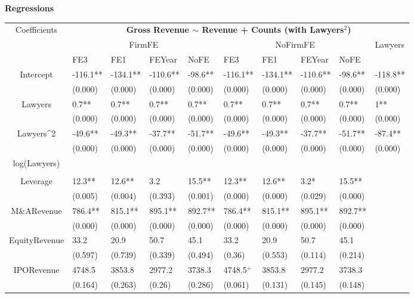 \documentclass{article}
\begin{document}
\newpage
{\large \textbf{Regressions} }
\begin{table}[H]
\centering
\begin{tabular}{|clllllllll|}
\hline
\multirow{3}{*}{Coefficients} & \multicolumn{9}{c|}{\textbf{Gross Revenue $\sim$ Revenue + Counts (with Lawyers$^2$)}} \\
\cline{2-10}
& \multicolumn{4}{c}{FirmFE} & \multicolumn{4}{c}{NoFirmFE} & \multirow{2}{*}{Lawyers} \\
\cline{2-9}
& FE3 & FE1 & FEYear & NoFE & FE3 & FE1 & FEYear & NoFE &  \\
\hline
 
Intercept & -116.1** & -134.1** & -110.6** & -98.6** & -116.1** & -134.1** & -110.6** & -98.6** & -118.8** \\ 
   & (0.000) & (0.000) & (0.000) & (0.000) & (0.000) & (0.000) & (0.000) & (0.000) & (0.000) \\ 
  Lawyers & 0.7** & 0.7** & 0.7** & 0.7** & 0.7** & 0.7** & 0.7** & 0.7** & 1** \\ 
   & (0.000) & (0.000) & (0.000) & (0.000) & (0.000) & (0.000) & (0.000) & (0.000) & (0.000) \\ 
  Lawyers^2 & -49.6** & -49.3** & -37.7** & -51.7** & -49.6** & -49.3** & -37.7** & -51.7** & -87.4** \\ 
   & (0.000) & (0.000) & (0.000) & (0.000) & (0.000) & (0.000) & (0.000) & (0.000) & (0.000) \\ 
  log(Lawyers) &  &  &  &  &  &  &  &  &  \\ 
   &  &  &  &  &  &  &  &  &  \\ 
  Leverage & 12.3** & 12.6** & 3.2 & 15.5** & 12.3** & 12.6** & 3.2* & 15.5** &  \\ 
   & (0.005) & (0.004) & (0.393) & (0.001) & (0.000) & (0.000) & (0.029) & (0.000) &  \\ 
  M\&ARevenue & 786.4** & 815.1** & 895.1** & 892.7** & 786.4** & 815.1** & 895.1** & 892.7** &  \\ 
   & (0.000) & (0.000) & (0.000) & (0.000) & (0.000) & (0.000) & (0.000) & (0.000) &  \\ 
  EquityRevenue & 33.2 & 20.9 & 50.7 & 45.1 & 33.2 & 20.9 & 50.7 & 45.1 &  \\ 
   & (0.597) & (0.739) & (0.339) & (0.494) & (0.36) & (0.553) & (0.114) & (0.214) &  \\ 
  IPORevenue & 4748.5 & 3853.8 & 2977.2 & 3738.3 & 4748.5$^{+}$ & 3853.8 & 2977.2 & 3738.3 &  \\ 
   & (0.164) & (0.263) & (0.26) & (0.286) & (0.061) & (0.131) & (0.145) & (0.148) &  \\ 

\end{tabular}
\end{table}
\end{document}
